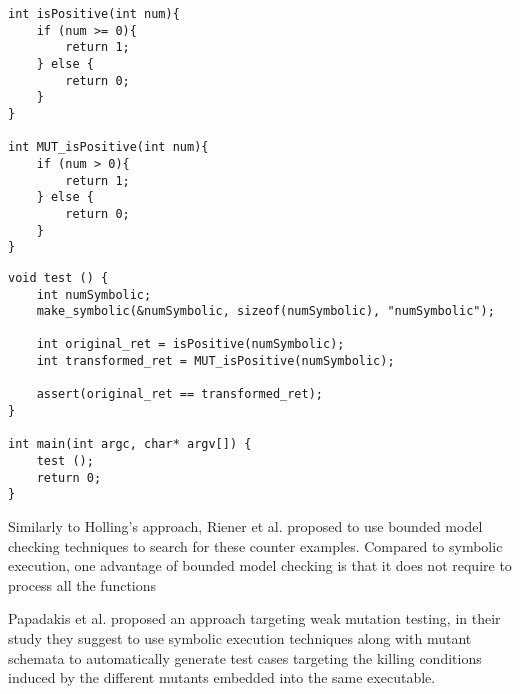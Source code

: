 \begin{lstlisting}[style=CStyle, caption=isPositive and MUT\_isPositive functions, label=function]
int isPositive(int num){
	if (num >= 0){
		return 1;
	} else {
		return 0;
	}
}

int MUT_isPositive(int num){
	if (num > 0){
		return 1;
	} else {
		return 0;
	}
}

\end{lstlisting}

\begin{lstlisting}[style=CStyle, caption=Holling's approach for test case generation., label=example]
void test () { 
	int numSymbolic; 
	make_symbolic(&numSymbolic, sizeof(numSymbolic), "numSymbolic"); 
 	
 	int original_ret = isPositive(numSymbolic); 
	int transformed_ret = MUT_isPositive(numSymbolic); 
 
	assert(original_ret == transformed_ret); 
} 
 
int main(int argc, char* argv[]) { 
	test (); 
	return 0; 
}
\end{lstlisting}

Similarly to Holling's approach, Riener et al. \cite{riener2011test} proposed to use bounded model checking techniques to search for these counter examples.
Compared to symbolic execution, one advantage of bounded model checking is that it does not require to process all the functions

Papadakis et al. \cite{papadakis2011automatically, papadakis2010towards} proposed an approach targeting weak mutation testing, in their study they suggest to use symbolic execution techniques along with mutant schemata to automatically generate test cases targeting the killing conditions induced by the different mutants embedded into the same executable.

